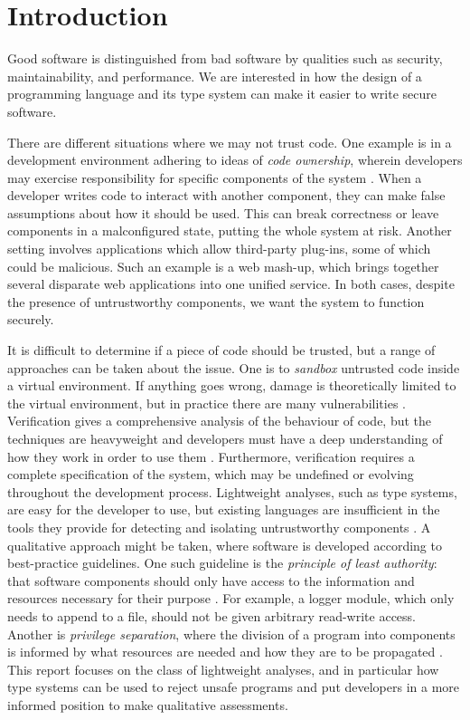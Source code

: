 \chapter{Introduction}\label{C:intro}

Good software is distinguished from bad software by qualities such as security, maintainability, and performance. We are interested in how the design of a programming language and its type system can make it easier to write secure software.

There are different situations where we may not trust code. One example is in a development environment adhering to ideas of \textit{code ownership}, wherein developers may exercise responsibility for specific components of the system \cite{bird_ownership}. When a developer writes code to interact with another component, they can make false assumptions about how it should be used. This can break correctness or leave components in a malconfigured state, putting the whole system at risk. Another setting involves applications which allow third-party plug-ins, some of which could be malicious. Such an example is a web mash-up, which brings together several disparate web applications into one unified service. In both cases, despite the presence of untrustworthy components, we want the system to function securely.

It is difficult to determine if a piece of code should be trusted, but a range of approaches can be taken about the issue. One is to \textit{sandbox} untrusted code inside a virtual environment. If anything goes wrong, damage is theoretically limited to the virtual environment, but in practice there are many vulnerabilities \cite{coker15, maass16, watson07, schreuders13}. Verification gives a comprehensive analysis of the behaviour of code, but the techniques are heavyweight and developers must have a deep understanding of how they work in order to use them \cite{kneuper97}. Furthermore, verification requires a complete specification of the system, which may be undefined or evolving throughout the development process. Lightweight analyses, such as type systems, are easy for the developer to use, but existing languages are insufficient in the tools they provide for detecting and isolating untrustworthy components \cite{chen07, ter-louw08}. A qualitative approach might be taken, where software is developed according to best-practice guidelines. One such guideline is the \textit{principle of least authority}: that software components should only have access to the information and resources necessary for their purpose \cite{saltzer74}. For example, a logger module, which only needs to append to a file, should not be given arbitrary read-write access. Another is \textit{privilege separation}, where the division of a program into components is informed by what resources are needed and how they are to be propagated \cite{saltzer75}. This report focuses on the class of lightweight analyses, and in particular how type systems can be used to reject unsafe programs and put developers in a more informed position to make qualitative assessments.

